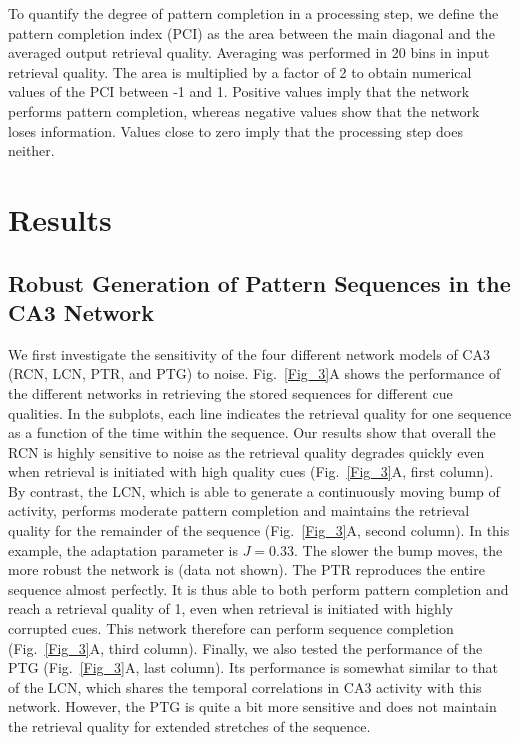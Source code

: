 \documentclass[utf8]{frontiersSCNS} %
\begin{document}
To quantify the degree of pattern completion in a processing step, we define the pattern completion index (PCI) as the area between the main diagonal and the averaged output retrieval quality. Averaging was performed in 20 bins in input retrieval quality. The area is multiplied by a factor of 2 to obtain numerical values of the PCI between -1 and 1. Positive values imply that the network performs pattern completion, whereas negative values show that the network loses information. Values close to zero imply that the processing step does neither. 

\section{Results}
\subsection{Robust Generation of Pattern Sequences in the CA3 Network}

We first investigate the sensitivity of the four different network models of CA3 (RCN, LCN, PTR, and PTG) to noise. Fig.~\ref{Fig_3}A shows the performance of the different networks in retrieving the stored sequences for different cue qualities. In the subplots, each line indicates the retrieval quality for one sequence as a function of the time within the sequence. Our results show that overall the RCN is highly sensitive to noise as the retrieval quality degrades quickly even when retrieval is initiated with high quality cues (Fig.~\ref{Fig_3}A, first column). 
By contrast, the LCN, which is able to generate a continuously moving bump of activity, performs moderate pattern completion and maintains the retrieval quality for the remainder of the sequence (Fig.~\ref{Fig_3}A, second column). In this example, the adaptation parameter is $J = 0.33$. The slower the bump moves, the more robust the network is (data not shown).
The PTR reproduces the entire sequence almost perfectly. It is thus able to both perform pattern completion and reach a retrieval quality of 1, even when retrieval is initiated with highly corrupted cues. This network therefore can perform sequence completion (Fig.~\ref{Fig_3}A, third column).
Finally, we also tested the performance of the PTG (Fig.~\ref{Fig_3}A, last column). Its performance is somewhat similar to that of the LCN, which shares the temporal correlations in CA3 activity  with this network. However, the PTG is quite a bit more sensitive and does not maintain the retrieval quality for extended stretches of the sequence.
\end{document}
